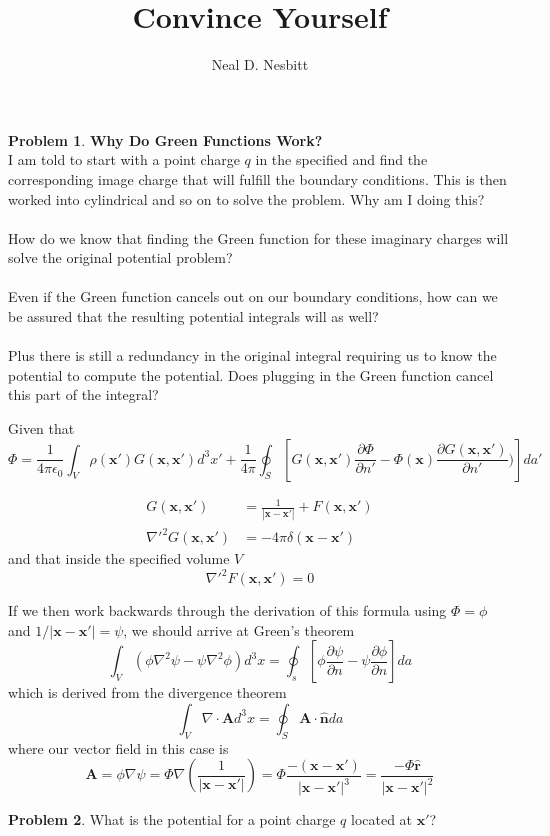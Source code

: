 \documentclass{article}
\title{Convince Yourself}
\author{Neal D. Nesbitt}
\begin{document}
\maketitle

\theoremstyle{definition}
\newtheorem{problem}{Problem}

\begin{problem} 
\textbf{Why Do Green Functions Work?}\\
I am told to start with a point charge $q$ in the specified and find the corresponding image charge that will fulfill the boundary conditions. This is then worked into cylindrical and so on to solve the problem. Why am I doing this?\\
\\How do we know that finding the Green function for these imaginary charges will solve the original potential problem?\\
\\
Even if the Green function cancels out on our boundary conditions, how can we be assured that the resulting potential integrals will as well?\\
\\
Plus there is still a redundancy in the original integral requiring us to know the potential to compute the potential. Does plugging in the Green function cancel this part of the integral?
\end{problem}
Given that
\[ \Phi = \frac{1}{4\pi\epsilon_{0}} \int_{V} \rho(\mathbf{x'}) G(\mathbf{x},\mathbf{x'}) d^{3}x' + \frac{1}{4\pi} \oint_{S} \left[ G(\mathbf{x},\mathbf{x'}) \frac{\partial\Phi}{\partial n'} -\Phi(\mathbf{x}) \frac{\partial G(\mathbf{x},\mathbf{x'})}{\partial n'}) \right] da' \]

\begin{align*}
G(\mathbf{x},\mathbf{x'}) &= \frac{1}{\left| \mathbf{x}-\mathbf{x'} \right|} + F(\mathbf{x},\mathbf{x'})\\
\nabla'^{2} G(\mathbf{x},\mathbf{x'}) &= -4\pi\delta(\mathbf{x}-\mathbf{x'})
\end{align*}
and that inside the specified volume $V$ 
\[ \nabla'^{2} F(\mathbf{x},\mathbf{x'}) = 0 \]

If we then work backwards through the derivation of this formula using $\Phi=\phi$ and $1/\left|\mathbf{x}-\mathbf{x'}\right|=\psi$, we should arrive at Green's theorem
\[ \int_{V} \left( \phi\nabla^{2}\psi - \psi\nabla^{2}\phi \right) d^{3}x = \oint_{s} \left[ \phi\frac{\partial\psi}{\partial n} - \psi\frac{\partial\phi}{\partial n} \right] da \]
which is derived from the divergence theorem
\[ \int_{V} \nabla\cdot\mathbf{A} d^{3}x = \oint_{S} \mathbf{A}\cdot\mathbf{\hat{n}} da \]
where our vector field in this case is 
\[ \mathbf{A}=\phi\nabla\psi = \Phi\nabla\left(\frac{1}{\left|\mathbf{x}-\mathbf{x'}\right|}\right) = \Phi \frac{-(\mathbf{x}-\mathbf{x'})}{\left|\mathbf{x}-\mathbf{x'}\right|^{3}} = \frac{-\Phi\mathbf{\hat{r}}}{\left|\mathbf{x}-\mathbf{x'}\right|^{2}} \]

\begin{problem}
What is the potential for a point charge $q$ located at $\mathbf{x'}$?
\end{problem}
\end{document}
